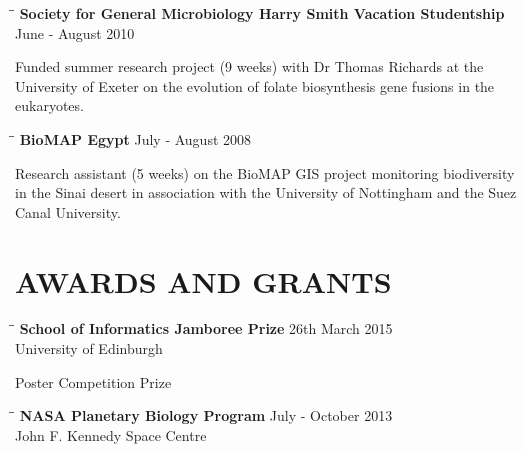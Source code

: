 \documentclass{res}
\begin{document}
\begin{resume}
   \vspace{-0.1in}
      \begin{tabbing}
   \hspace{2in}\= \hspace{2.6in}\= \kill 
    {\bf Society for General Microbiology Harry Smith Vacation Studentship} \> \>        June - August 2010\\
     \end{tabbing}\vspace{-20pt}      
     Funded summer research project (9 weeks) with Dr Thomas Richards at the University of Exeter on the evolution of folate biosynthesis gene fusions in the eukaryotes.

\vspace{-0.1in}
   \begin{tabbing}
   \hspace{2in}\= \hspace{2.6in}\= \kill 
    {\bf BioMAP Egypt} \> \>        July - August 2008\\
     \end{tabbing}\vspace{-20pt}      
     Research assistant (5 weeks) on the BioMAP GIS project monitoring biodiversity in the Sinai desert in association with the University of Nottingham and the Suez Canal University.

\section{AWARDS AND GRANTS}

  \begin{tabbing}
   \hspace{2in}\= \hspace{2.6in}\= \kill 
    {\bf School of Informatics Jamboree Prize} \> \> 26th March 2015\\
                            \> 
                            \> University of Edinburgh\\

   \end{tabbing}\vspace{-30pt}
   Poster Competition Prize 
   \vspace{-0.05in}  

  \begin{tabbing}
   \hspace{2in}\= \hspace{2.6in}\= \kill 
    {\bf NASA Planetary Biology Program} \> \>July - October 2013\\
                            \> 
                            \> John F. Kennedy Space Centre\\


\end{tabbing}
\end{resume}
\end{document}
